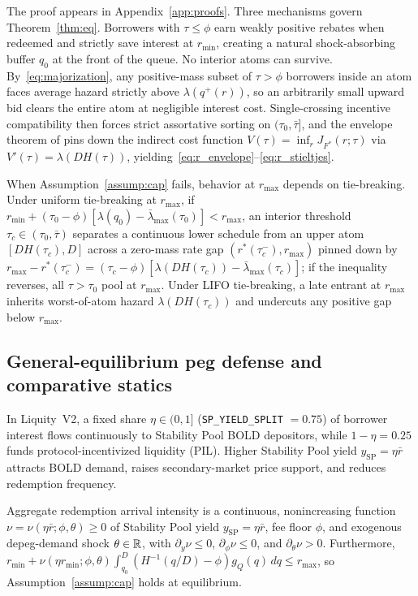 The proof appears in Appendix~\ref{app:proofs}. Three mechanisms govern Theorem~\ref{thm:eq}. Borrowers with $\tau \le \phi$ earn weakly positive rebates when redeemed and strictly save interest at $r_{\min}$, creating a natural shock-absorbing buffer $q_0$ at the front of the queue. No interior atoms can survive. By~\eqref{eq:majorization}, any positive-mass subset of $\tau > \phi$ borrowers inside an atom faces average hazard strictly above $\lambda(q^+(r))$, so an arbitrarily small upward bid clears the entire atom at negligible interest cost. Single-crossing incentive compatibility then forces strict assortative sorting on $(\tau_0, \bar{\tau}]$, and the envelope theorem of \citet{milgrom2002envelope} pins down the indirect cost function $V(\tau) = \inf_r J_{F^*}(r; \tau)$ via $V'(\tau) = \lambda(D H(\tau))$, yielding~\eqref{eq:r_envelope}--\eqref{eq:r_stieltjes}.

\begin{remark}\label{rem:capped}
When Assumption~\ref{assump:cap} fails, behavior at $r_{\max}$ depends on tie-breaking. Under uniform tie-breaking at $r_{\max}$, if $r_{\min} + (\tau_0 - \phi)[\lambda(q_0) - \bar{\lambda}_{\max}(\tau_0)] < r_{\max}$, an interior threshold $\tau_c \in (\tau_0, \bar{\tau})$ separates a continuous lower schedule from an upper atom $[D H(\tau_c), D]$ across a zero-mass rate gap $(r^*(\tau_c^-), r_{\max})$ pinned down by $r_{\max} - r^*(\tau_c^-) = (\tau_c - \phi)[\lambda(D H(\tau_c)) - \bar{\lambda}_{\max}(\tau_c)]$; if the inequality reverses, all $\tau > \tau_0$ pool at $r_{\max}$. Under LIFO tie-breaking, a late entrant at $r_{\max}$ inherits worst-of-atom hazard $\lambda(D H(\tau_c))$ and undercuts any positive gap below $r_{\max}$.
\end{remark}

\subsection{General-equilibrium peg defense and comparative statics}\label{subsec:ge}

In Liquity~V2, a fixed share $\eta \in (0, 1]$ (\texttt{SP\_YIELD\_SPLIT} $= 0.75$) of borrower interest flows continuously to Stability Pool BOLD depositors, while $1 - \eta = 0.25$ funds protocol-incentivized liquidity (PIL). Higher Stability Pool yield $y_{\mathrm{SP}} = \eta \bar{r}$ attracts BOLD demand, raises secondary-market price support, and reduces redemption frequency.

\begin{assumption}\label{assump:macro}
Aggregate redemption arrival intensity is a continuous, nonincreasing function $\nu = \nu(\eta \bar{r}; \phi, \theta) \ge 0$ of Stability Pool yield $y_{\mathrm{SP}} = \eta \bar{r}$, fee floor $\phi$, and exogenous depeg-demand shock $\theta \in \mathbb{R}$, with $\partial_y \nu \le 0$, $\partial_\phi \nu \le 0$, and $\partial_\theta \nu > 0$. Furthermore, $r_{\min} + \nu(\eta r_{\min}; \phi, \theta)\int_{q_0}^D (H^{-1}(q/D) - \phi) g_Q(q)\,dq \le r_{\max}$, so Assumption~\ref{assump:cap} holds at equilibrium.
\end{assumption}

